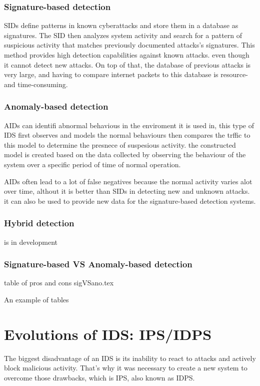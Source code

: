 \subsubsection{Signature-based detection}
SIDs define patterns in known cyberattacks and store them in a database as signatures. The SID then analyzes system activity and search for a pattern of suspicious activity that matches previously documented attacks's signatures. This method provides high detection capabilities against known attacks. even though it cannot detect new attacks. On top of that, the database of previous attacks is very large, and having to compare internet packets to this database is resource- and time-consuming. \cite{NIST-IDS}



\subsubsection{Anomaly-based detection}
AIDs can identifi abnormal behavious in the enviroment it is used in, this type of IDS first observes and models the normal behaviours then compares the trffic to this model to determine the presnece of suspesious activity. the constructed model is created based on the data collected by observing the behaviour of the system over a specific period of time of normal operation. \cite{NIST-IDS}

AIDs often lead to a lot of false negatives because the normal activity varies alot over time, althout it is better than SIDs in detecting new and unknown attacks. it can also be used to provide new data for the signature-based detection systems. \cite{NIST-IDS}




\subsubsection{Hybrid detection}
is in development
\clearpage

\subsubsection{Signature-based VS Anomaly-based detection}
table of pros and cons
sigVSano.tex
\begin{table}[h]
	\centering
	\caption{An example of tables}
	
	\label{tab:example}
\end{table}




\section{Evolutions of IDS: IPS/IDPS}
The biggest disadvantage of an IDS is its inability to react to attacks and actively block malicious activity. That's why it was necessary to create a new system to overcome those drawbacks, which is IPS, also known as IDPS.

